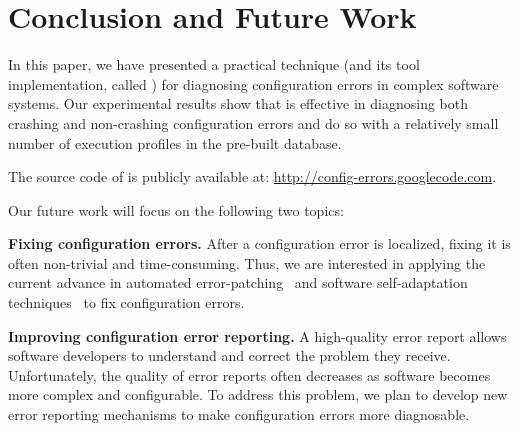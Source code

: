 \section{Conclusion and Future Work}

In this paper, we have presented a practical technique (and
its tool implementation, called \ourtool) for diagnosing
configuration errors in complex software systems.
Our experimental results show that \ourtool is effective in
diagnosing both crashing and non-crashing configuration errors
and do so with a relatively small number of execution
profiles in the pre-built database.

The source code of \ourtool is publicly available at:
\url{http://config-errors.googlecode.com}.

\vspace{1mm}

Our future
work will focus on the following two topics:

\textbf{Fixing configuration errors.} After a configuration error
is localized, fixing it is
often non-trivial and time-consuming. Thus, we
are interested in applying the current advance in
automated error-patching~\cite{rangefix} and
software self-adaptation techniques~\cite{Wang:2009:STR, Mori:2011:LSU} to
fix configuration errors.


\textbf{Improving configuration error reporting.} A high-quality
error report allows software developers to understand and correct the problem
they receive. 
Unfortunately, the quality of error reports often
decreases as software becomes more complex and configurable.
To address this problem, we plan to develop new error reporting mechanisms
to make configuration errors
more diagnosable.

